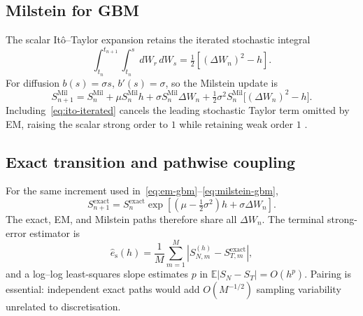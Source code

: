 \documentclass[11pt,a4paper]{article}
\theoremstyle{definition}
\theoremstyle{remark}
\begin{document}
\subsection{Milstein for GBM}
The scalar It\^o--Taylor expansion retains the iterated stochastic integral
\begin{equation}
 \int_{t_n}^{t_{n+1}}\int_{t_n}^{s}dW_r\,dW_s
 =\tfrac12\left[(\Delta W_n)^2-h\right].
 \label{eq:ito-iterated}
\end{equation}
For diffusion $b(s)=\sigma s$, $b'(s)=\sigma$, so the Milstein update is
\begin{equation}
 S_{n+1}^{\mathrm{Mil}}
 =S_n^{\mathrm{Mil}}+\mu S_n^{\mathrm{Mil}}h
 +\sigma S_n^{\mathrm{Mil}}\Delta W_n
 +\tfrac12\sigma^2S_n^{\mathrm{Mil}}\bigl[(\Delta W_n)^2-h\bigr].
 \label{eq:milstein-gbm}
\end{equation}
Including~\eqref{eq:ito-iterated} cancels the leading stochastic Taylor term
omitted by EM, raising the scalar strong order to $1$ while retaining weak order
$1$ \cite{milstein1995}.

\subsection{Exact transition and pathwise coupling}
For the same increment used in~\eqref{eq:em-gbm}--\eqref{eq:milstein-gbm},
\begin{equation}
 S_{n+1}^{\mathrm{exact}}
 =S_n^{\mathrm{exact}}
 \exp\!\left[\left(\mu-\tfrac12\sigma^2\right)h+\sigma\Delta W_n\right].
 \label{eq:exact-step}
\end{equation}
The exact, EM, and Milstein paths therefore share all $\Delta W_n$.  The terminal
strong-error estimator is
\begin{equation}
 \widehat e_{\mathrm{s}}(h)
 =\frac1M\sum_{m=1}^{M}\left|S_{N,m}^{(h)}-S_{T,m}^{\mathrm{exact}}\right|,
 \label{eq:strong-estimator}
\end{equation}
and a log--log least-squares slope estimates $p$ in
$\mathbb E|S_N-S_T|=O(h^p)$.  Pairing is essential: independent exact paths
would add $O(M^{-1/2})$ sampling variability unrelated to discretisation.
\end{document}
